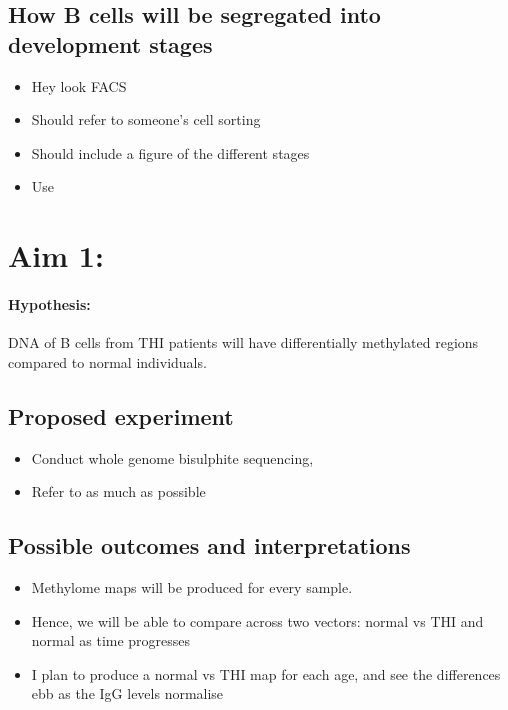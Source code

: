 \documentclass[12pt]{article}
\begin{document}
		\subsection{How B cells will be segregated into development stages}
			
			\begin{itemize}
				\item Hey look FACS
				\item Should refer to someone's cell sorting
				\item Should include a figure of the different stages
				\item Use \citeauthor{Kulis15}
			\end{itemize}
		
	
	\section{Aim 1:}
		
		\paragraph{Hypothesis:} DNA of B cells from THI patients will have differentially methylated regions compared to normal individuals.
		
		\subsection{Proposed experiment}
			
			\begin{itemize}
				\item Conduct whole genome bisulphite sequencing, 
				\item Refer to \citeauthor{Kulis15} as much as possible
			\end{itemize}
		
		\subsection{Possible outcomes and interpretations}		
			
			\begin{itemize}
				\item Methylome maps will be produced for every sample. 
				\item Hence, we will be able to compare across two vectors: normal vs THI and normal as time progresses
				\item I plan to produce a normal vs THI map for each age, and see the differences ebb as the IgG levels normalise
			\end{itemize}
	
\end{document}
